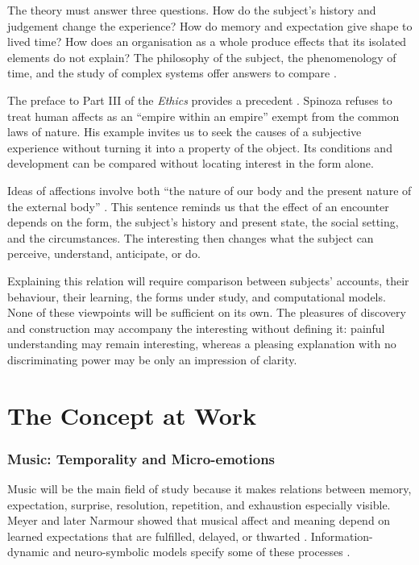 \documentclass[11pt,a4paper]{article}
\begin{document}
The theory must answer three questions. How do the subject's history and
judgement change the experience? How do memory and expectation give shape to
lived time? How does an organisation as a whole produce effects that its
isolated elements do not explain? The philosophy of the subject, the
phenomenology of time, and the study of complex systems offer answers to compare
\parencite{petitot1993phenomenologie,petitot2002naturaliser}.

The preface to Part III of the \emph{Ethics} provides a precedent
\parencite{spinoza1966ethique}. Spinoza refuses to
treat human affects as an ``empire within an empire'' exempt from the common
laws of nature. His example invites us to seek the causes of a subjective
experience without turning it into a property of the object. Its conditions
and development can be compared without locating interest in the form alone.

Ideas of affections involve both ``the nature of our body and the present nature
of the external body''
\parencite[III, prop. XXVII, dem.]{spinoza1861oeuvres}. This sentence reminds us
that the effect of an encounter depends on the form, the subject's history and
present state, the social setting, and the circumstances. The interesting then
changes what the subject can perceive, understand, anticipate, or do.

Explaining this relation will require comparison between subjects' accounts,
their behaviour, their learning, the forms under study, and computational
models. None of these viewpoints will be sufficient on its own. The pleasures
of discovery and construction
\parencite{feynman1999pleasure,florman1996existential} may accompany the
interesting without defining it: painful understanding may remain interesting,
whereas a pleasing explanation with no discriminating power may be only an
impression of clarity.

\part{The Concept at Work}

\section{Music: Temporality and Micro-emotions}

Music will be the main field of study because it makes relations
between memory, expectation, surprise, resolution, repetition, and exhaustion
especially visible. Meyer and later Narmour showed that musical affect and
meaning depend on learned expectations that are fulfilled, delayed, or thwarted
\parencite{meyer1956emotion,narmour1990basic,narmour1992complexity}.
Information-dynamic and neuro-symbolic models specify some of these processes
\parencite{abdallah2009information,berger1999expectations,gang1999unified}.
\end{document}
